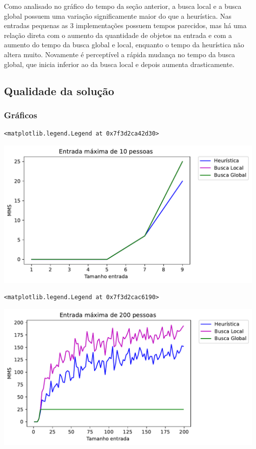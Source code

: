 \documentclass[a4paper,11pt,final]{article}
\begin{document}
Como analisado no gráfico do tempo da seção anterior, a busca local e a busca global possuem uma 
variação significamente maior do que a heurística. Nas entradas pequenas as 3 implementações possuem 
tempos parecidos, mas há uma relação direta com o aumento da quantidade de objetos na entrada e com a
aumento do tempo da busca global e local, enquanto o tempo da heurística não altera muito. Novamente
é perceptível a rápida mudança no tempo da busca global, que inicia inferior ao da busca local e depois
aumenta drasticamente.

\subsection{Qualidade da solução}


\subsubsection{Gráficos}


\begin{verbatim}
<matplotlib.legend.Legend at 0x7f3d2ca42d30>
\end{verbatim}
\includegraphics[width= 15 cm]{figures/teste_figure14_1.pdf}



\begin{verbatim}
<matplotlib.legend.Legend at 0x7f3d2cac6190>
\end{verbatim}
\includegraphics[width= 15 cm]{figures/teste_figure15_1.pdf}
\end{document}
